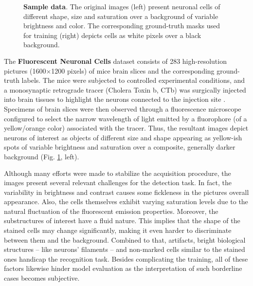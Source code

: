\begin{figure}[ht]
{\textbf{Sample data}. The original images (left) present neuronal cells of different shape, size and saturation over a background of variable brightness and color.
The corresponding ground-truth masks used for training (right) depicts cells as white pixels over a black background.
} 
\label{fig:dataset}
\end{figure}

The \textbf{Fluorescent Neuronal Cells} dataset \cite{clissa2021fluocells} consists of 283 high-resolution pictures (1600$\times$1200 pixels) of mice brain slices and the corresponding ground-truth labels.
The mice were subjected to controlled experimental conditions, and a monosynaptic retrograde tracer (Cholera Toxin b, CTb) was surgically injected into brain tissues to highlight the neurons connected to the injection site
\cite{hitrec2019neural}.
Specimens of brain slices were then observed through  
a fluorescence microscope configured to select the narrow wavelength of light emitted by 
a fluorophore (of a yellow/orange color) associated with the tracer.
Thus, the resultant images depict neurons of interest as objects of different size and shape appearing as yellow-ish spots of variable brightness and saturation over a composite, generally darker background (Fig. \ref{fig:dataset}, left).

Although many efforts were made to stabilize the acquisition procedure, the images present several relevant challenges for the detection task. 
In fact, the variability in brightness and contrast causes some fickleness in the pictures overall appearance.  
Also, the cells themselves exhibit varying saturation levels due to the natural fluctuation of the fluorescent emission properties. 
Moreover, the substructures of interest have a fluid nature. This implies that the shape of the stained cells may change significantly, making it even harder to discriminate between them and the background. 
Combined to that, artifacts, bright biological structures -- like neurons' filaments -- and non-marked cells similar to the stained ones handicap the recognition task. 
Besides complicating the training, all of these factors %
likewise hinder model evaluation as the interpretation of such borderline cases becomes subjective.

